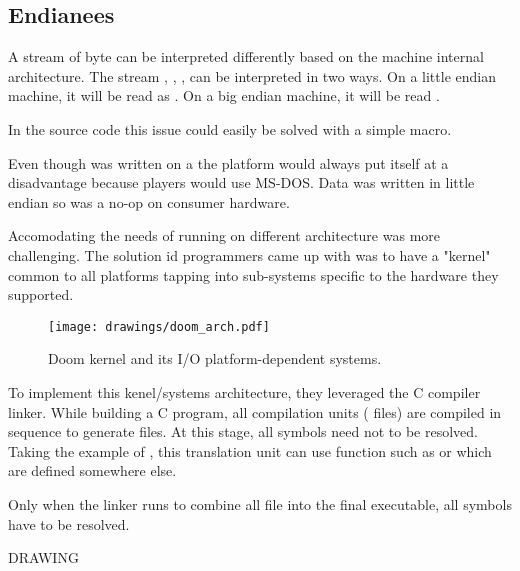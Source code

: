 \subsection{Endianees}
A stream of byte can be interpreted differently based on the machine internal architecture. The stream , , ,  can be interpreted in two ways. On a little endian machine, it will be read as . On a big endian machine, it will be read .\\
\par
{}
\par
In the source code this issue could easily be solved with a simple macro.\\
\par
{}
\par
Even though \doom was written on a \NeXT the platform would always put itself at a disadvantage because players would use MS-DOS. Data was written in little endian so  was a no-op on consumer hardware.\\
\par
{}
\par
Accomodating the needs of running on different architecture was more challenging. The solution id programmers came up with was to have a "kernel" common to all platforms tapping into sub-systems specific to the hardware they supported.\\
\par
\begin{figure}[H]
\centering
\texttt{[image: drawings/doom\_arch.pdf]}
\caption{Doom kernel and its I/O platform-dependent systems.}
\end{figure}
\par

To implement this kenel/systems architecture, they leveraged the C compiler linker. While building a C program, all compilation units ( files) are compiled in sequence to generate  files. At this stage, all symbols need not to be resolved. Taking the example of , this translation unit can use function such as  or  which are defined somewhere else. \\
\par
{}
\par
Only when the linker runs to combine all  file into the final executable, all symbols have to be resolved.\\
\par
DRAWING\\
\pagebreak






